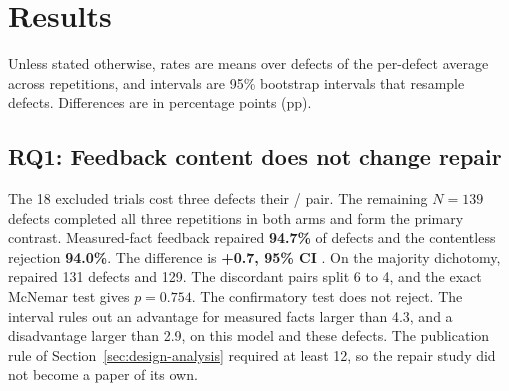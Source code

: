 \section{Results}
\label{sec:results}

Unless stated otherwise, rates are means over defects of the per-defect
average across repetitions, and intervals are 95\% bootstrap intervals that
resample defects. Differences are in percentage points (pp).

\subsection{RQ1: Feedback content does not change repair}
\label{sec:results-rq1}

The 18 excluded trials cost three defects their / pair. The
remaining $N=139$ defects completed all three repetitions in both arms and form
the primary contrast. Measured-fact feedback repaired \textbf{94.7\%}
of defects and the contentless rejection \textbf{94.0\%}. The difference is
\textbf{+0.7\pp{}, 95\% CI }. On the majority dichotomy, 
repaired 131 defects and  129. The discordant pairs split 6 to 4, and
the exact McNemar test gives $p=0.754$. The confirmatory test does not reject.
The interval rules out an advantage for measured facts larger than 4.3\pp{}, and
a disadvantage larger than 2.9\pp{}, on this model and these defects. The
publication rule of Section~\ref{sec:design-analysis} required at least 12\pp{},
so the repair study did not become a paper of its own.

